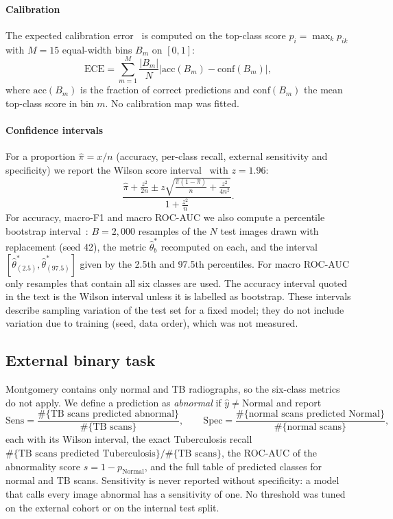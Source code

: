 \paragraph{Calibration} The expected calibration error~\cite{naeini2015obtaining,guo2017calibration} is computed on the top-class score $\hat p_i=\max_k p_{ik}$ with $M=15$ equal-width bins $B_m$ on $[0,1]$:
\begin{equation}
\mathrm{ECE}=\sum_{m=1}^{M}\frac{|B_m|}{N}\left|\mathrm{acc}(B_m)-\mathrm{conf}(B_m)\right|,
\label{eq:ece}
\end{equation}
where $\mathrm{acc}(B_m)$ is the fraction of correct predictions and $\mathrm{conf}(B_m)$ the mean top-class score in bin $m$. No calibration map was fitted.

\paragraph{Confidence intervals} For a proportion $\hat\pi=x/n$ (accuracy, per-class recall, external sensitivity and specificity) we report the Wilson score interval~\cite{wilson1927probable} with $z=1.96$:
\begin{equation}
\frac{\hat\pi+\frac{z^2}{2n}\pm z\sqrt{\frac{\hat\pi(1-\hat\pi)}{n}+\frac{z^2}{4n^2}}}{1+\frac{z^2}{n}} .
\label{eq:wilson}
\end{equation}
For accuracy, macro-F1 and macro ROC-AUC we also compute a percentile bootstrap interval~\cite{efron1994introduction}: $B=2{,}000$ resamples of the $N$ test images drawn with replacement (seed 42), the metric $\hat\theta^{*}_b$ recomputed on each, and the interval $[\hat\theta^{*}_{(2.5)},\hat\theta^{*}_{(97.5)}]$ given by the 2.5th and 97.5th percentiles. For macro ROC-AUC only resamples that contain all six classes are used. The accuracy interval quoted in the text is the Wilson interval unless it is labelled as bootstrap. These intervals describe sampling variation of the test set for a fixed model; they do not include variation due to training (seed, data order), which was not measured.

\subsection{External binary task}
\label{sec:exttask}
Montgomery contains only normal and TB radiographs, so the six-class metrics do not apply. We define a prediction as \emph{abnormal} if $\hat y\neq\text{Normal}$ and report
\begin{equation}
\mathrm{Sens}=\frac{\#\{\text{TB scans predicted abnormal}\}}{\#\{\text{TB scans}\}},\qquad
\mathrm{Spec}=\frac{\#\{\text{normal scans predicted Normal}\}}{\#\{\text{normal scans}\}},
\end{equation}
each with its Wilson interval, the exact Tuberculosis recall $\#\{\text{TB scans predicted Tuberculosis}\}/\#\{\text{TB scans}\}$, the ROC-AUC of the abnormality score $s=1-p_{\text{Normal}}$, and the full table of predicted classes for normal and TB scans. Sensitivity is never reported without specificity: a model that calls every image abnormal has a sensitivity of one. No threshold was tuned on the external cohort or on the internal test split.

